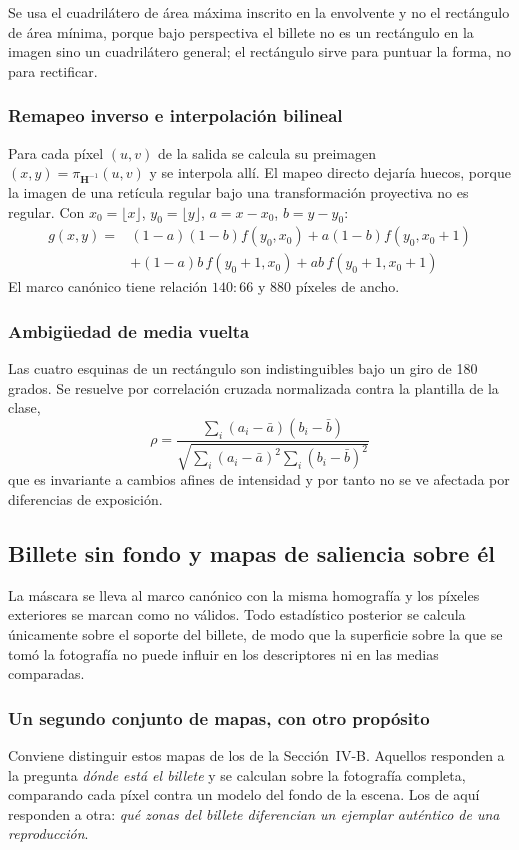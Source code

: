 \documentclass[conference]{IEEEtran}
\begin{document}
Se usa el cuadrilátero de área máxima inscrito en la envolvente y no el
rectángulo de área mínima, porque bajo perspectiva el billete no es un
rectángulo en la imagen sino un cuadrilátero general; el rectángulo
sirve para puntuar la forma, no para rectificar.

\subsubsection{Remapeo inverso e interpolación bilineal}
Para cada píxel $(u,v)$ de la salida se calcula su preimagen
$(x,y)=\pi_{\mathbf{H}^{-1}}(u,v)$ y se interpola allí. El mapeo
directo dejaría huecos, porque la imagen de una retícula regular bajo
una transformación proyectiva no es regular. Con
$x_0=\lfloor x\rfloor$, $y_0=\lfloor y\rfloor$, $a=x-x_0$, $b=y-y_0$:
\begin{align}
g(x,y) = &(1-a)(1-b)f(y_0,x_0) + a(1-b)f(y_0,x_0{+}1)\nonumber\\
&+(1-a)b\,f(y_0{+}1,x_0) + ab\,f(y_0{+}1,x_0{+}1)
\end{align}
El marco canónico tiene relación $140{:}66$ y 880 píxeles de ancho.

\subsubsection{Ambigüedad de media vuelta}
Las cuatro esquinas de un rectángulo son indistinguibles bajo un giro
de 180 grados. Se resuelve por correlación cruzada normalizada contra
la plantilla de la clase,
\begin{equation}
\rho = \frac{\sum_i (a_i-\bar a)(b_i-\bar b)}
{\sqrt{\sum_i (a_i-\bar a)^2 \sum_i (b_i-\bar b)^2}}
\end{equation}
que es invariante a cambios afines de intensidad y por tanto no se ve
afectada por diferencias de exposición.

\subsection{Billete sin fondo y mapas de saliencia sobre él}

La máscara se lleva al marco canónico con la misma homografía y los
píxeles exteriores se marcan como no válidos. Todo estadístico
posterior se calcula únicamente sobre el soporte del billete, de modo
que la superficie sobre la que se tomó la fotografía no puede influir
en los descriptores ni en las medias comparadas.

\subsubsection{Un segundo conjunto de mapas, con otro propósito}
Conviene distinguir estos mapas de los de la Sección~IV-B. Aquellos
responden a la pregunta \emph{dónde está el billete} y se calculan
sobre la fotografía completa, comparando cada píxel contra un modelo
del fondo de la escena. Los de aquí responden a otra: \emph{qué zonas
del billete diferencian un ejemplar auténtico de una reproducción}.
\end{document}
